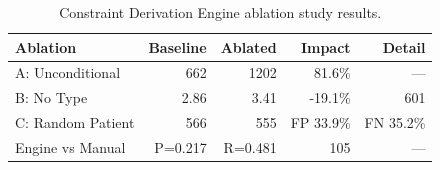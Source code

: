 \begin{table}[htbp]
\centering
\caption{Constraint Derivation Engine ablation study results.}
\label{tab:ablation}
\begin{tabular}{lrrrr}
\toprule
Ablation & Baseline & Ablated & Impact & Detail \\
\midrule
A: Unconditional & 662 & 1202 & 81.6\% & --- \\
B: No Type & 2.86 & 3.41 & -19.1\% & 601 \\
C: Random Patient & 566 & 555 & FP 33.9\% & FN 35.2\% \\
Engine vs Manual & P=0.217 & R=0.481 & 105 & --- \\
\bottomrule
\end{tabular}
\end{table}
